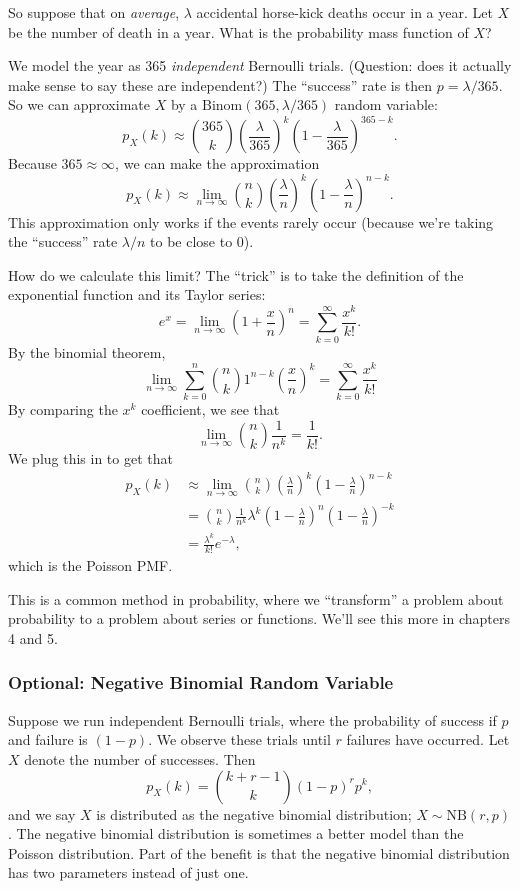 \documentclass{ximera}
\begin{document}
So suppose that on \textit{average}, $\lambda$ accidental horse-kick deaths occur in a year. Let $X$ be the number of death in a year. What is the probability mass function of $X$?

We model the year as 365 \textit{independent} Bernoulli trials. (Question: does it actually make sense to say these are independent?) The ``success'' rate is then $p=\lambda/365$. So we can approximate $X$ by a $\text{Binom}(365,\lambda/365)$ random variable:
$$
p_X(k) \approx \binom{365}{k} \left( \frac{\lambda}{365}\right)^k \left( 1- \frac{\lambda}{365}\right)^{365-k}.
$$ 
Because $365\approx \infty$, we can make the approximation
$$
p_X(k) \approx \lim_{n\rightarrow\infty} \binom{n}{k} \left( \frac{\lambda}{n}\right)^k \left( 1- \frac{\lambda}{n}\right)^{n-k}.
$$
This approximation only works if the events rarely occur (because we're taking the ``success'' rate $\lambda/n$ to be close to $0$).

How do we calculate this limit? The ``trick'' is to take the definition of the exponential function and its Taylor series:
$$
e^x = \lim_{n\rightarrow \infty} \left( 1 + \frac{x}{n}\right)^n = \sum_{k=0}^{\infty} \frac{x^k}{k!}.
$$
By the binomial theorem,
$$
\lim_{n\rightarrow\infty} \sum_{k=0}^n \binom{n}{k} 1^{n-k} \left( \frac{x}{n}\right)^k = \sum_{k=0}^{\infty} \frac{x^k}{k!}
$$
By comparing the $x^k$ coefficient, we see that
$$
\lim_{n\rightarrow \infty} \binom{n}{k} \frac{1}{n^k} = \frac{1}{k!}.
$$
We plug this in to get that
\begin{align*}
p_X(k) &\approx \lim_{n\rightarrow\infty} \binom{n}{k} \left( \frac{\lambda}{n}\right)^k \left( 1- \frac{\lambda}{n}\right)^{n-k} \\
&= \binom{n}{k} \frac{1}{n^k} \lambda^k \left( 1- \frac{\lambda}{n}\right)^{n} \left( 1- \frac{\lambda}{n}\right)^{-k}\\
&= \frac{\lambda^k}{k!} e^{-\lambda},
\end{align*}
which is the Poisson PMF.

\Lightning \Lightning This is a common method in probability, where we ``transform'' a problem about probability to a problem about series or functions. We'll see this more in chapters 4 and 5. \Lightning \Lightning

\subsubsection{{\color{lime} Optional: Negative Binomial Random Variable}}
Suppose we run independent Bernoulli trials, where the probability of success if $p$ and failure is $(1-p)$. We observe these trials until $r$ failures have occurred. Let $X$ denote the number of successes. Then
$$
p_X(k) = \binom{k+r-1}{k} (1-p)^r p^k,
$$
and we say $X$ is distributed as the negative binomial distribution; $X\sim \text{NB}(r,p)$. The negative binomial distribution is sometimes a better model than the Poisson distribution. Part of the benefit is that the negative binomial distribution has two parameters instead of just one. 
\end{document}
